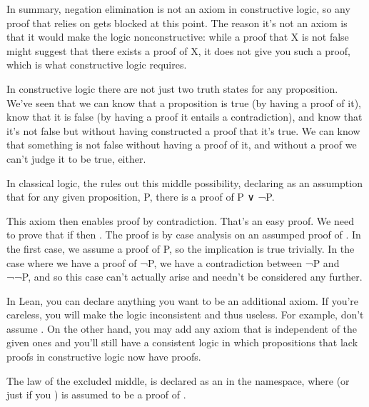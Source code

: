\documentclass[letterpaper,10pt,english]{sphinxmanual}
\begin{document}
\sphinxAtStartPar
In summary, negation elimination is not an axiom in constructive
logic, so any proof that relies on  gets blocked at
this point. The reason it’s not an axiom is that it would make
the logic non\sphinxhyphen{}constructive: while a proof that X is not false
might suggest that there exists a proof of X, it does not give
you such a proof, which is what constructive logic requires.

\sphinxAtStartPar
In constructive logic there are not just two truth states
for any proposition. We’ve seen that we can know that a
proposition is true (by having a proof of it), know that
it is false (by having a proof it entails a contradiction),
and know that it’s not false but without having constructed
a proof that it’s true. We can know that something is not
false without having a proof of it, and without a proof we
can’t judge it to be true, either.

\sphinxAtStartPar
In classical logic, the 
rules out this middle possibility, declaring as an assumption
that for any given proposition, P, there is a proof of P ∨ ¬P.

\sphinxAtStartPar
This axiom then enables proof by contradiction. That’s an easy
proof. We need to prove that if  then . The
proof is by case analysis on an assumped proof of .
In the first case, we assume a proof of P, so the implication
is true trivially. In the case where we have a proof of ¬P, we
have a contradiction between ¬P and ¬¬P, and so this case can’t
actually arise and needn’t be considered any further.

\sphinxAtStartPar
In Lean, you can declare anything you want to be an additional
axiom. If you’re careless, you will make the logic inconsistent
and thus useless. For example, don’t assume . On
the other hand, you may add any axiom that is independent of the
given ones and you’ll still have a consistent logic in which
propositions that lack proofs in constructive logic now have
proofs.

\sphinxAtStartPar
The law of the excluded middle,  is declared as an
 in the  namespace, where  (or
just  if you ) is assumed to be a proof of
.
\end{document}
